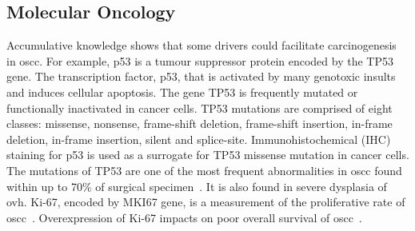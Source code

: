 \documentclass[12pt, a4paper]{article}
\begin{document}
\subsection{Molecular Oncology}
Accumulative knowledge shows that some drivers could facilitate carcinogenesis in \acrshort{oscc}.
For example, p53 is a tumour suppressor protein encoded by the TP53 gene.
The transcription factor, p53, that is activated by many genotoxic insults and induces cellular apoptosis. 
The gene TP53 is frequently mutated or functionally inactivated in cancer cells.
TP53 mutations are comprised of eight classes: missense, nonsense, frame-shift deletion, frame-shift insertion, in-frame deletion, in-frame insertion, silent and splice-site.
Immunohistochemical (IHC) staining for p53 is used as a surrogate for TP53 missense mutation in cancer cells. 
The mutations of TP53 are one of the most frequent abnormalities in \acrshort{oscc} found within up to 70\% of surgical specimen~\citep{Alsner2001, Singh2016, Wang2017, WARD2018}. It is also found in severe dysplasia of \acrshort{ovh}.
Ki-67, encoded by MKI67 gene, is a measurement of the proliferative rate of \acrshort{oscc}~\citep{Silva2004}.
Overexpression of Ki-67 impacts on poor overall survival of \acrshort{oscc}~\citep{Perisanidis2012,Szentkuti2015}.
\end{document}
